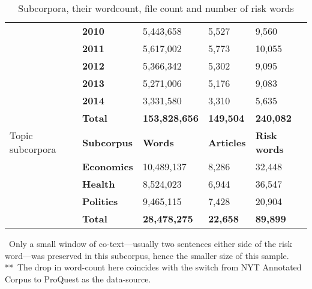 \begin{table}
\begin{tabular}{p{1.5cm}|l|l|l|l|}
~ & \textbf{2010} & 5,443,658 & 5,527 &  9,560  \\ \cline{2-5}
~ & \textbf{2011} & 5,617,002 & 5,773 & 10,055  \\ \cline{2-5}
~ & \textbf{2012} & 5,366,342 & 5,302 &  9,095  \\ \cline{2-5}
~ & \textbf{2013} & 5,271,006 & 5,176 &  9,083  \\ \cline{2-5}
~ & \textbf{2014} & 3,331,580 & 3,310 &  5,635 \\ \cline{2-5}
~ & \textbf{Total} & \textbf{153,828,656} & \textbf{149,504} & \textbf{240,082} \\ \hline
\multicolumn{1}{|p{1.5cm}|}{Topic \mbox{subcorpora}} & \textbf{Subcorpus} & \textbf{Words} & \textbf{Articles} & \textbf{Risk words}   \\ \hline
~ & \textbf{Economics} & 10,489,137 & 8,286 & 32,448 \\ \cline{2-5}
~ & \textbf{Health}    & 8,524,023  & 6,944 & 36,547 \\ \cline{2-5}
~ & \textbf{Politics}  & 9,465,115  & 7,428 & 20,904 \\ \cline{2-5}
~ & \textbf{Total} & \textbf{28,478,275} & \textbf{22,658} & \textbf{89,899} \\ \cline{2-5}
\end{tabular}
    \caption{Subcorpora, their wordcount, file count and number of risk words}
    \label{tab:stats}
    \medskip %
\begin{minipage}{0.9\textwidth} %
{\footnotesize *~Only a small window of co-text---usually two sentences either side of the risk word---was preserved in this subcorpus, hence the smaller size of this sample.~\\
**~The drop in word-count here coincides with the switch from NYT Annotated Corpus to ProQuest as the data-source.\par}
\end{minipage}
\end{table}


